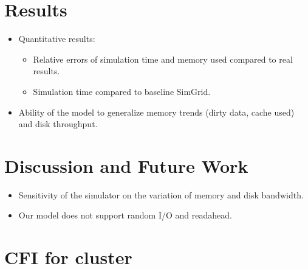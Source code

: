 \documentclass[conference]{IEEEtran}
\begin{document}
	\section{Results}
	
		\begin{itemize}

			\item Quantitative results: 
				\begin{itemize}
					\item Relative errors of simulation time and memory used compared to real results.
					\item Simulation time compared to baseline SimGrid.
				\end{itemize} 

			\item Ability of the model to generalize memory trends (dirty data, cache used) and disk throughput.

		\end{itemize}

	\section{Discussion and Future Work}
		\begin{itemize}
			\item Sensitivity of the simulator on the variation of memory and disk bandwidth. 
			\item Our model does not support random I/O and readahead.
		\end{itemize}
	\section{CFI for cluster}


\end{document}
